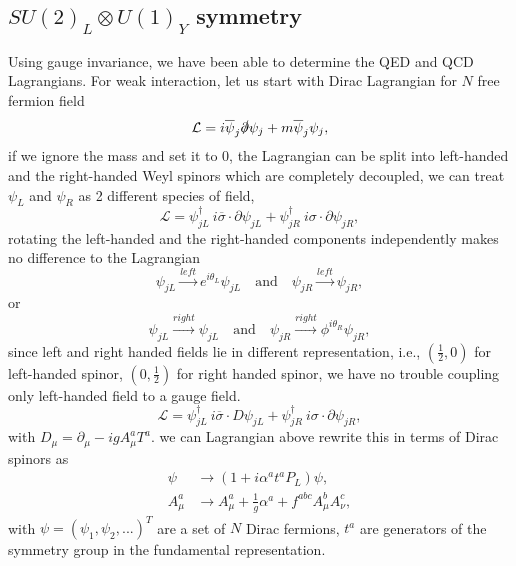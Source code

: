 \documentclass{report}
\numberwithin{equation}{section}
\begin{document}
\subsection{$SU(2)_L\otimes U(1)_Y$ symmetry}
Using gauge invariance, we have been able to determine the QED and QCD Lagrangians. For weak interaction, let us start with Dirac Lagrangian for $N$ free fermion field
\begin{equation}
    \mathcal{L}=i\overline{\psi}_j\slashed{\partial} \psi_j+m\overline{\psi}_j\psi_j,
\end{equation}
if we ignore the mass and set it to 0, the Lagrangian can be split into
left-handed and the right-handed  Weyl spinors which are completely decoupled, we can treat $\psi_L$ and $\psi_R$ as 2 different species of field,
\begin{equation}
    \mathcal{L}=\psi^\dagger_{jL}\ i \overline{\sigma}\cdot \partial \psi_{jL}+\psi^\dagger_{jR}\ i \sigma\cdot \partial \psi_{jR},
\end{equation}
rotating the left-handed and the right-handed components independently makes no difference to the Lagrangian
\begin{equation}
\psi_{jL}\xrightarrow{left}e^{i\theta_L} \psi_{jL} \quad \text{and} \quad \psi_{jR}\xrightarrow{left}\psi_{jR},
\end{equation}
or
\begin{equation}
\psi_{jL}\xrightarrow{right}\psi_{jL} \quad \text{and} \quad \psi_{jR}\xrightarrow{right}\phi^{i\theta_R}\psi_{jR},
\end{equation}
since left and right handed fields lie in different representation, i.e., $(\frac{1}{2},0)$ for left-handed spinor, $(0,\frac{1}{2})$ for right handed spinor, we have no trouble coupling  only left-handed field to a gauge field. \\
\begin{equation}
    \mathcal{L}=\psi^\dagger_{jL}\ i \overline{\sigma}\cdot D \psi_{jL}+\psi^\dagger_{jR}\ i \sigma\cdot \partial \psi_{jR},
\end{equation}
with $D_\mu=\partial_\mu -igA_\mu^aT^a$. we can Lagrangian above rewrite this in terms of Dirac spinors as
\begin{align}
    \psi &\rightarrow \left( 1+ i \alpha^a t^a P_L\right)\psi,\\
    A_\mu^a&\rightarrow A_\mu^a +\frac{1}{g}\alpha^a+f^{abc} A_\mu^b A_\nu^c,
\end{align}
with $\psi=(\psi_1,\psi_2,...)^T$ are a set of $N$ Dirac fermions, $t^a$ are generators of the symmetry group in the fundamental representation.\\
\end{document}
